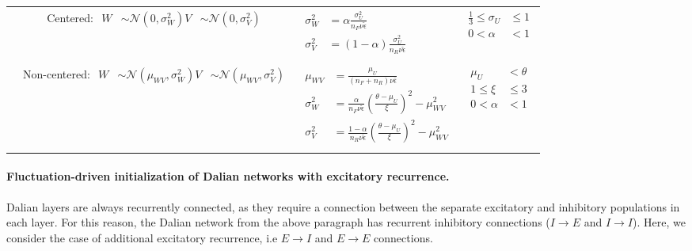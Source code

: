 \documentclass[11pt,a4paper]{article}
\begin{document}
\begin{table}[htpb]
\begin{tabular*}{\textwidth}{@{\extracolsep{\fill}}lclc}
& \makecell{Centered: \\
            $\begin{aligned}
                W &\sim \mathcal{N}\left(0, \sigma_W^2\right) \\
                V &\sim \mathcal{N}\left(0, \sigma_V^2\right)
            \end{aligned}$} 
& $\begin{aligned}
           \sigma^2_W &= \alpha \frac{\sigma_U^2}{n_F \nu \hat\epsilon} \\
\sigma^2_V &= \left(1 - \alpha\right) \frac{\sigma_U^2}{n_R \nu \hat\epsilon}
\\
    \end{aligned}$ 
& $\begin{aligned}
\frac{1}{3}\le\sigma_U&\le 1\\ 
        0<\alpha&<1
    \end{aligned}$
\\
\addlinespace
\cmidrule(l){2-4}
& \makecell{Non-centered: \\
            $\begin{aligned}
                W &\sim \mathcal{N}\left(\mu_{WV}, \sigma_W^2\right) \\
                V &\sim \mathcal{N}\left(\mu_{WV}, \sigma_V^2\right)
            \end{aligned}$}   
& $\begin{aligned}
           \mu_{WV} &= \frac{\mu_U}{\left(n_F+n_R\right) \nu \bar\epsilon}  \\
\sigma^2_W &= \frac{\alpha}{n_F \nu \hat\epsilon} \left(\frac{\theta -
                \mu_U}{\xi} \right)^2 - \mu_{WV}^2 \\
\sigma^2_V &= \frac{1 - \alpha}{n_R \nu \hat\epsilon} \left(\frac{\theta -
                \mu_U}{\xi} \right)^2 - \mu_{WV}^2
    \end{aligned}$ 
& $\begin{aligned}
        \mu_U&<\theta\\
        1\le\xi&\le 3\\
        0<\alpha&<1
    \end{aligned}$\\
\addlinespace
\bottomrule
\end{tabular*}
\label{tab:nondalian_init}
\end{table}
 
 
\paragraph{Fluctuation-driven initialization of Dalian networks with excitatory recurrence.}
Dalian layers are always recurrently connected, as they require a connection between the separate excitatory and inhibitory populations in each layer. For this reason, the Dalian network from the above paragraph has recurrent inhibitory connections ($I \rightarrow E$ and $I \rightarrow I$). Here, we consider the case of additional excitatory recurrence, i.e $E \rightarrow I$ and $E \rightarrow E$ connections. 
\end{document}
